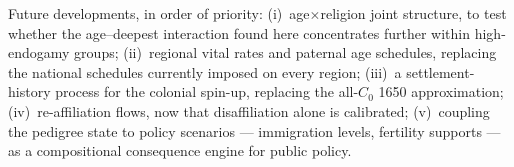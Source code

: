 \documentclass[11pt,a4paper]{article}
\begin{document}
Future developments, in order of priority: (i)~age$\times$religion
joint structure, to test whether the age--deepest interaction found
here concentrates further within high-endogamy groups; (ii)~regional
vital rates and paternal age schedules, replacing the national
schedules currently imposed on every region; (iii)~a settlement-history
process for the colonial spin-up, replacing the all-$C_0$ 1650
approximation; (iv)~re-affiliation flows, now that disaffiliation alone
is calibrated; (v)~coupling the pedigree state to policy scenarios ---
immigration levels, fertility supports --- as a compositional
consequence engine for public policy.



\end{document}
